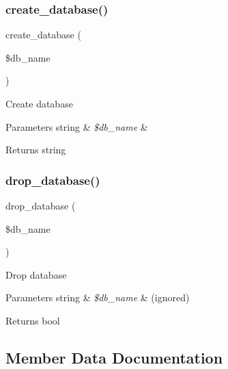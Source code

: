 \subsubsection{\texorpdfstring{create\+\_\+database()}{create\_database()}}
{\footnotesize\ttfamily create\+\_\+database (\begin{DoxyParamCaption}\item[{}]{\$db\+\_\+name }\end{DoxyParamCaption})}

Create database


\begin{DoxyParams}[1]{Parameters}
string & {\em \$db\+\_\+name} & \\
\hline
\end{DoxyParams}
\begin{DoxyReturn}{Returns}
string 
\end{DoxyReturn}
\mbox{\label{class_c_i___d_b__pdo__firebird__forge_a9612987b2d4230de2638d15857e92e67}} 
\subsubsection{\texorpdfstring{drop\+\_\+database()}{drop\_database()}}
{\footnotesize\ttfamily drop\+\_\+database (\begin{DoxyParamCaption}\item[{}]{\$db\+\_\+name }\end{DoxyParamCaption})}

Drop database


\begin{DoxyParams}[1]{Parameters}
string & {\em \$db\+\_\+name} & (ignored) \\
\hline
\end{DoxyParams}
\begin{DoxyReturn}{Returns}
bool 
\end{DoxyReturn}


\subsection{Member Data Documentation}
\mbox{\label{class_c_i___d_b__pdo__firebird__forge_ae58fe6a5104d4a069a49b27533ce808f}} 
